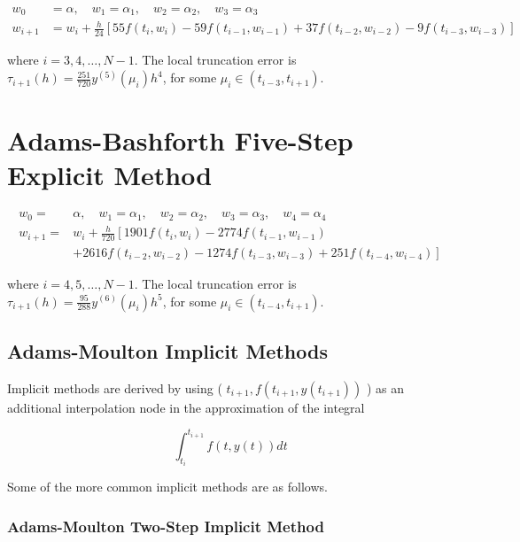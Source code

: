 \begin{equation}\label{eqn:multistepeq15}
\begin{split}
w_{0} & =\alpha, \quad w_{1}=\alpha_{1}, \quad w_{2}=\alpha_{2}, \quad w_{3}=\alpha_{3}  \\
w_{i+1} & =w_{i}+\frac{h}{24}\left[55 f\left(t_{i}, w_{i}\right)-59 f\left(t_{i-1}, w_{i-1}\right)+37 f\left(t_{i-2}, w_{i-2}\right)-9 f\left(t_{i-3}, w_{i-3}\right)\right]
\end{split}
\end{equation}

where $i=3,4, \ldots, N-1$. The local truncation error is $\tau_{i+1}(h)=\frac{251}{720} y^{(5)}\left(\mu_{i}\right) h^{4}$, for some $\mu_{i} \in\left(t_{i-3}, t_{i+1}\right)$.

\section*{Adams-Bashforth Five-Step Explicit Method}

\begin{equation}\label{eqn:multistepeq16}
\begin{split}
w_{0}= & \alpha, \quad w_{1}=\alpha_{1}, \quad w_{2}=\alpha_{2}, \quad w_{3}=\alpha_{3}, \quad w_{4}=\alpha_{4} \\
w_{i+1}= & w_{i}+\frac{h}{720}\left[1901 f\left(t_{i}, w_{i}\right)-2774 f\left(t_{i-1}, w_{i-1}\right)\right. \\
& \left.+2616 f\left(t_{i-2}, w_{i-2}\right)-1274 f\left(t_{i-3}, w_{i-3}\right)+251 f\left(t_{i-4}, w_{i-4}\right)\right]
\end{split}
\end{equation}

where $i=4,5, \ldots, N-1$. The local truncation error is $\tau_{i+1}(h)=\frac{95}{288} y^{(6)}\left(\mu_{i}\right) h^{5}$, for some $\mu_{i} \in\left(t_{i-4}, t_{i+1}\right)$.

\subsection*{Adams-Moulton Implicit Methods}
Implicit methods are derived by using ( $t_{i+1}, f\left(t_{i+1}, y\left(t_{i+1}\right)\right)$ ) as an additional interpolation node in the approximation of the integral

$$
\int_{t_{i}}^{t_{i+1}} f(t, y(t)) d t
$$

Some of the more common implicit methods are as follows.

\subsubsection*{Adams-Moulton Two-Step Implicit Method}

